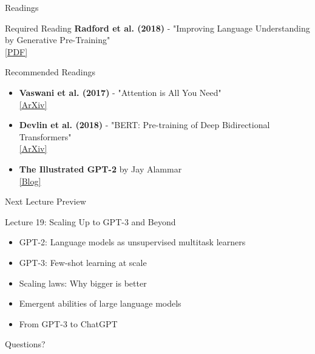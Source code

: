 \documentclass[aspectratio=169]{beamer}
\begin{document}
\begin{frame}{Readings 📖}
    \begin{block}{Required Reading}
        \textbf{Radford et al. (2018)} - "Improving Language Understanding by Generative Pre-Training" \\
        \href{https://cdn.openai.com/research-covers/language-unsupervised/language_understanding_paper.pdf}{[PDF]}
    \end{block}

    \vspace{0.3cm}

    \begin{block}{Recommended Readings}
        \begin{itemize}\setlength{\itemsep}{0pt}
            \item \textbf{Vaswani et al. (2017)} - "Attention is All You Need" \\
            \href{https://arxiv.org/abs/1706.03762}{[ArXiv]}

            \item \textbf{Devlin et al. (2018)} - "BERT: Pre-training of Deep Bidirectional Transformers" \\
            \href{https://arxiv.org/abs/1810.04805}{[ArXiv]}

            \item \textbf{The Illustrated GPT-2} by Jay Alammar \\
            \href{https://jalammar.github.io/illustrated-gpt2/}{[Blog]}
        \end{itemize}
    \end{block}
\end{frame}

\begin{frame}{Next Lecture Preview 🔮}
\small
    \begin{block}{Lecture 19: Scaling Up to GPT-3 and Beyond}
        \begin{itemize}\setlength{\itemsep}{0pt}
            \item GPT-2: Language models as unsupervised multitask learners
            \item GPT-3: Few-shot learning at scale
            \item Scaling laws: Why bigger is better
            \item Emergent abilities of large language models
            \item From GPT-3 to ChatGPT
        \end{itemize}
    \end{block}

    \vspace{0.5cm}

    \begin{center}
        \Large{Questions? 💬}
    \end{center}
\end{frame}
\end{document}
